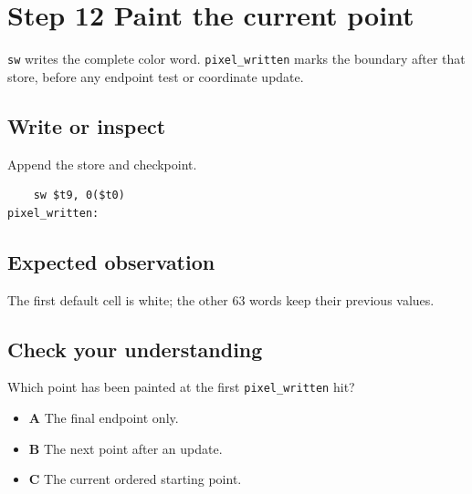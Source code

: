 \section{Step 12 Paint the current
  point}\label{007-bresenham-line-s12-step-12-paint-the-current-point}

\texttt{sw} writes the complete color word. \texttt{pixel\_written}
marks the boundary after that store, before any endpoint test or
coordinate update.

\subsection{Write or
  inspect}\label{007-bresenham-line-s12-write-or-inspect}

Append the store and checkpoint.

\begin{verbatim}
    sw $t9, 0($t0)
pixel_written:
\end{verbatim}

\subsection{Expected
  observation}\label{007-bresenham-line-s12-expected-observation}

The first default cell is white; the other 63 words keep their previous
values.

\subsection{Check your
  understanding}\label{007-bresenham-line-s12-check-your-understanding}

Which point has been painted at the first \texttt{pixel\_written} hit?

\begin{itemize}
  \tightlist
  \item
        \textbf{A} The final endpoint only.
  \item
        \textbf{B} The next point after an update.
  \item
        \textbf{C} The current ordered starting point.
\end{itemize}
